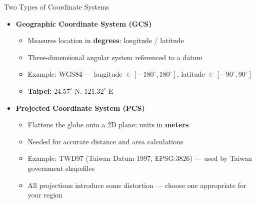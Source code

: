 \documentclass[dvipsnames,hyperref={pdfpagelabels=false}]{beamer}
\begin{document}
\begin{frame}{Two Types of Coordinate Systems}
\begin{itemize}
  \item \textbf{Geographic Coordinate System (GCS)}
  \vspace{0.15cm}
  \begin{itemize}
    \item Measures location in \textbf{degrees}: longitude / latitude
    \vspace{0.1cm}
    \item Three-dimensional angular system referenced to a datum
    \vspace{0.1cm}
    \item Example: WGS84 --- longitude $\in [-180^\circ, 180^\circ]$,
          latitude $\in [-90^\circ, 90^\circ]$
    \vspace{0.1cm}
    \item \textbf{Taipei:} $24.57^\circ$ N, $121.32^\circ$ E
  \end{itemize}
  \vspace{0.35cm}
  \item \textbf{Projected Coordinate System (PCS)}
  \vspace{0.15cm}
  \begin{itemize}
    \item Flattens the globe onto a 2D plane; units in \textbf{meters}
    \vspace{0.1cm}
    \item Needed for accurate distance and area calculations
    \vspace{0.1cm}
    \item Example: TWD97 (Taiwan Datum 1997, EPSG:3826) ---
          used by Taiwan government shapefiles
    \vspace{0.1cm}
    \item All projections introduce some distortion --- choose one
          appropriate for your region
  \end{itemize}
\end{itemize}
\end{frame}
\end{document}
